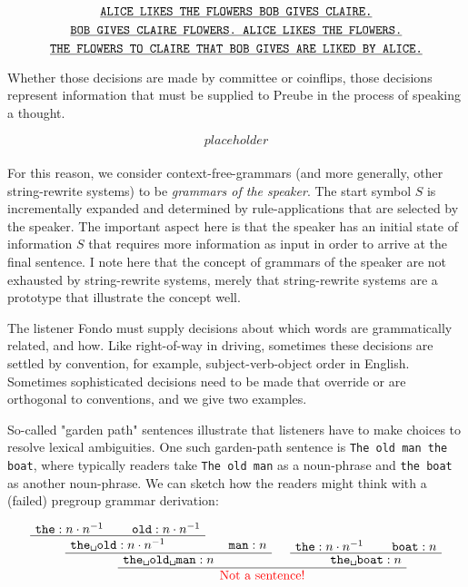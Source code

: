 \begin{fullwidth}
\[\texttt{\underline{ALICE LIKES THE FLOWERS BOB GIVES CLAIRE.}}\]
\[\texttt{\underline{BOB GIVES CLAIRE FLOWERS. ALICE LIKES THE FLOWERS.}}\]
\[\texttt{\underline{THE FLOWERS TO CLAIRE THAT BOB GIVES ARE LIKED BY ALICE.}}\]

Whether those decisions are made by committee or coinflips, those decisions represent information that must be supplied to Preube in the process of speaking a thought.

\[placeholder\]\\

For this reason, we consider context-free-grammars (and more generally, other string-rewrite systems) to be \emph{grammars of the speaker}. The start symbol $S$ is incrementally expanded and determined by rule-applications that are selected by the speaker. The important aspect here is that the speaker has an initial state of information $S$ that requires more information as input in order to arrive at the final sentence. I note here that the concept of grammars of the speaker are not exhausted by string-rewrite systems, merely that string-rewrite systems are a prototype that illustrate the concept well.

 The listener Fondo must supply decisions about which words are grammatically related, and how. Like right-of-way in driving, sometimes these decisions are settled by convention, for example, subject-verb-object order in English. Sometimes sophisticated decisions need to be made that override or are orthogonal to conventions, and we give two examples.



\begin{example}
So-called "garden path" sentences illustrate that listeners have to make choices to resolve lexical ambiguities. One such garden-path sentence is \texttt{The old man the boat}, where typically readers take \texttt{The old man} as a noun-phrase and \texttt{the boat} as another noun-phrase. We can sketch how the readers might think with a (failed) pregroup grammar derivation:

\[
\AxiomC{$\texttt{the} : n \cdot n^{-1}$}
\AxiomC{$\texttt{old} : n \cdot n^{-1}$}
\BinaryInfC{$\texttt{the\textvisiblespace old}: n \cdot n^{-1}$}
\AxiomC{$\texttt{man} : n$}
\BinaryInfC{$\texttt{the\textvisiblespace old\textvisiblespace man}: n$}
\AxiomC{$\texttt{the} : n \cdot n^{-1}$}
\AxiomC{$\texttt{boat} : n$}
\BinaryInfC{$\texttt{the\textvisiblespace boat}: n$}
\BinaryInfC{\textcolor{red}{Not a sentence!}}
\DisplayProof
\]


\end{example}
\end{fullwidth}
